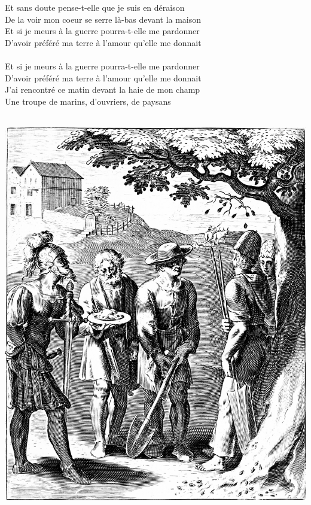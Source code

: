\\\\Et sans doute pense-t-elle que je suis en déraison
\\De la voir mon coeur se serre là-bas devant la maison
\\Et si je meurs à la guerre pourra-t-elle me pardonner
\\D'avoir préféré ma terre à l'amour qu'elle me donnait
\\\\Et si je meurs à la guerre pourra-t-elle me pardonner
\\D'avoir préféré ma terre à l'amour qu'elle me donnait
\\J'ai rencontré ce matin devant la haie de mon champ
\\Une troupe de marins, d'ouvriers, de paysans
\\\\
\bigskip
\begin{center}
   \includegraphics[width=1\textwidth]{images/brev22.png}
 \end{center}

\breakpage